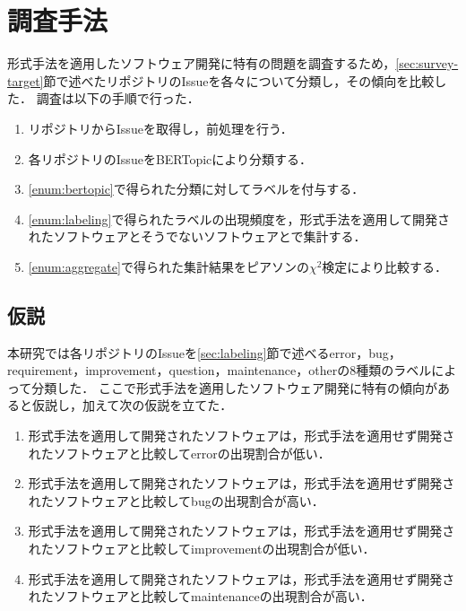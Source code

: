 \documentclass[main]{subfiles}
\begin{document}
\chapter{調査手法}

形式手法を適用したソフトウェア開発に特有の問題を調査するため，\ref{sec:survey-target}節で述べたリポジトリのIssueを各々について分類し，その傾向を比較した．
調査は以下の手順で行った．

\begin{enumerate}[label=手順\arabic*.]
	\item \label{enum:preprocess}
	      リポジトリからIssueを取得し，前処理を行う．
	\item \label{enum:bertopic}
	      各リポジトリのIssueをBERTopicにより分類する．
	\item \label{enum:labeling}
	      \ref{enum:bertopic}で得られた分類に対してラベルを付与する．
	\item \label{enum:aggregate}
	      \ref{enum:labeling}で得られたラベルの出現頻度を，形式手法を適用して開発されたソフトウェアとそうでないソフトウェアとで集計する．
	\item \label{enum:statistical}
	      \ref{enum:aggregate}で得られた集計結果をピアソンの\(\chi^2\)検定により比較する．
\end{enumerate}


\section{仮説}
\label{sec:hypothesis}

本研究では各リポジトリのIssueを\ref{sec:labeling}節で述べるerror，bug，requirement，improvement，question，maintenance，otherの8種類のラベルによって分類した．
ここで形式手法を適用したソフトウェア開発に特有の傾向があると仮説し，加えて次の仮説を立てた．

\begin{enumerate}[label=仮説\arabic*.]
	\item \label{hyp:1} 形式手法を適用して開発されたソフトウェアは，形式手法を適用せず開発されたソフトウェアと比較してerrorの出現割合が低い．
	\item \label{hyp:2} 形式手法を適用して開発されたソフトウェアは，形式手法を適用せず開発されたソフトウェアと比較してbugの出現割合が高い．
	\item \label{hyp:3} 形式手法を適用して開発されたソフトウェアは，形式手法を適用せず開発されたソフトウェアと比較してimprovementの出現割合が低い．
	\item \label{hyp:4} 形式手法を適用して開発されたソフトウェアは，形式手法を適用せず開発されたソフトウェアと比較してmaintenanceの出現割合が高い．
\end{enumerate}
\end{document}
